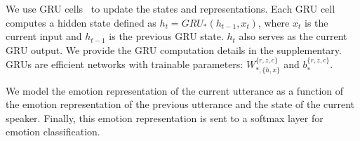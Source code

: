 \documentclass[letterpaper]{article} %
\begin{document}
We use GRU cells~\cite{DBLP:journals/corr/ChungGCB14} to update the states and representations. Each GRU cell computes a hidden state defined as $h_t=GRU_{\ast}(h_{t-1},x_t)$, where
$x_t$ is the current input and $h_{t-1}$ is the previous GRU state. $h_t$ also serves as the current GRU output. We provide the GRU computation details in the supplementary. GRUs are efficient networks with trainable parameters: $W_{\ast,\{h,x\}}^{\{r,z,c\}}$ and $b_{\ast}^{\{r,z,c\}}$. 


We model the emotion representation of the current utterance as a function of
the emotion representation of the previous utterance and the state of the
current speaker. Finally, this emotion representation is sent to a softmax layer
for emotion classification.

\end{document}
